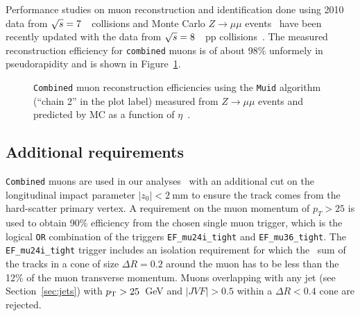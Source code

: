 Performance studies on muon reconstruction and identification done using 2010 data 
from $\rts=7$~\tev\ collisions and Monte Carlo $Z\to \mu\mu$ events~\cite{ATLAS-CONF-2011-063} 
have been recently updated with the data from $\rts=8$~\tev\ pp collisions~\cite{ATLAS-CONF-2013-088}.
The measured reconstruction efficiency for \texttt{combined} muons
is of about 98\% unformely in pseudorapidity and 
is shown in Figure~\ref{fig:mueff}. 


\begin{figure}[tb]\begin{center}
	\caption{\texttt{Combined} muon reconstruction efficiencies using the \texttt{Muid} algorithm 
        (``chain 2'' in the plot label) measured from $Z\to \mu\mu$ events and predicted by MC as a function 
        of $\eta$~\cite{ATLAS-CONF-2013-088}.\label{fig:mueff}}
\end{center}\end{figure}


\tocless\subsection{Additional requirements}

\texttt{Combined} muons are used in our analyses~\cite{topcommon2013} with an additional cut on the longitudinal impact
parameter $|z_0|<2~$mm to ensure the track comes  from the hard-scatter primary vertex.
A requirement on the muon momentum of $p_T>25$ is used to obtain 90\% efficiency from the chosen 
single muon trigger, which is the logical \texttt{OR} combination of the 
triggers \texttt{EF\_mu24i\_tight} and \texttt{EF\_mu36\_tight}. 
The \texttt{EF\_mu24i\_tight} trigger includes an isolation requirement 
for which the \pt\ sum of the tracks in a cone of size $\Delta R=0.2$  around the muon
has to be less than the 12\% of the muon transverse momentum.
Muons overlapping with any jet (see Section~\ref{sec:jets}) with $\pt>25$~GeV and $|JVF|>0.5$ 
within a $\Delta R<0.4$ cone are rejected.

